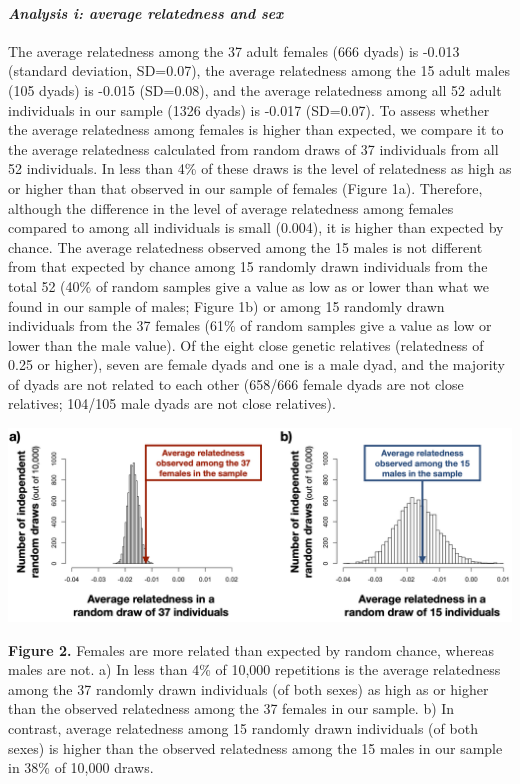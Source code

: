 \documentclass[
]{article}
\begin{document}
\hypertarget{analysis-i-average-relatedness-and-sex-1}{%
\paragraph{\texorpdfstring{\emph{Analysis i: average relatedness and
sex}}{Analysis i: average relatedness and sex}}\label{analysis-i-average-relatedness-and-sex-1}}

The average relatedness among the 37 adult females (666 dyads) is -0.013
(standard deviation, SD=0.07), the average relatedness among the 15
adult males (105 dyads) is -0.015 (SD=0.08), and the average relatedness
among all 52 adult individuals in our sample (1326 dyads) is -0.017
(SD=0.07). To assess whether the average relatedness among females is
higher than expected, we compare it to the average relatedness
calculated from random draws of 37 individuals from all 52 individuals.
In less than 4\% of these draws is the level of relatedness as high as
or higher than that observed in our sample of females (Figure 1a).
Therefore, although the difference in the level of average relatedness
among females compared to among all individuals is small (0.004), it is
higher than expected by chance. The average relatedness observed among
the 15 males is not different from that expected by chance among 15
randomly drawn individuals from the total 52 (40\% of random samples
give a value as low as or lower than what we found in our sample of
males; Figure 1b) or among 15 randomly drawn individuals from the 37
females (61\% of random samples give a value as low or lower than the
male value). Of the eight close genetic relatives (relatedness of 0.25
or higher), seven are female dyads and one is a male dyad, and the
majority of dyads are not related to each other (658/666 female dyads
are not close relatives; 104/105 male dyads are not close relatives).

\includegraphics{gdispersal_Figure1.png}

\textbf{Figure 2.} Females are more related than expected by random
chance, whereas males are not. a) In less than 4\% of 10,000 repetitions
is the average relatedness among the 37 randomly drawn individuals (of
both sexes) as high as or higher than the observed relatedness among the
37 females in our sample. b) In contrast, average relatedness among 15
randomly drawn individuals (of both sexes) is higher than the observed
relatedness among the 15 males in our sample in 38\% of 10,000 draws.
\end{document}
